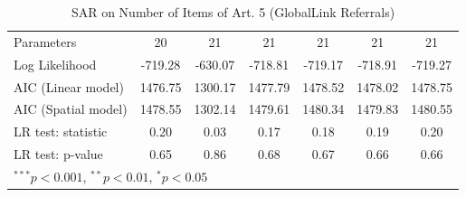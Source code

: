 \begin{table}[!h]
\begin{center}
\begin{tabular}{l c c c c c c }
Parameters              & 20           & 21           & 21           & 21           & 21           & 21           \\
Log Likelihood          & -719.28      & -630.07      & -718.81      & -719.17      & -718.91      & -719.27      \\
AIC (Linear model)      & 1476.75      & 1300.17      & 1477.79      & 1478.52      & 1478.02      & 1478.75      \\
AIC (Spatial model)     & 1478.55      & 1302.14      & 1479.61      & 1480.34      & 1479.83      & 1480.55      \\
LR test: statistic      & 0.20         & 0.03         & 0.17         & 0.18         & 0.19         & 0.20         \\
LR test: p-value        & 0.65         & 0.86         & 0.68         & 0.67         & 0.66         & 0.66         \\
\bottomrule
\multicolumn{7}{l}{\scriptsize{$^{***}p<0.001$, $^{**}p<0.01$, $^*p<0.05$}}
\end{tabular}
\caption{SAR on Number of Items of Art. 5 (GlobalLink Referrals)}
\label{table:coefficients}
\end{center}
\end{table}
